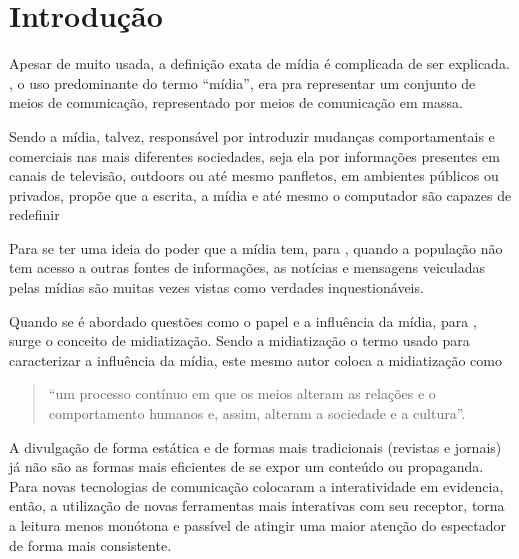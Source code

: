 \chapter[Introdução]{Introdução}
Apesar de muito usada, a definição exata de mídia é complicada de ser explicada.  \cite[p.49]{guazina2007} , o uso predominante do termo ``mídia'', era pra representar um conjunto de meios de comunicação, representado por meios de comunicação em massa.


Sendo a mídia, talvez, responsável por introduzir mudanças comportamentais e comerciais nas mais diferentes sociedades, seja ela por informações presentes em canais de televisão, outdoors ou até mesmo panfletos, em ambientes públicos ou privados, \cite[p.3]{escobar2007} propõe que a escrita, a mídia e até mesmo o computador são capazes de redefinir 
\begin{quote}  \end{quote} 



Para se ter uma ideia do poder que a mídia tem, para \cite{silva2007}, quando a população não tem acesso a outras fontes de informações, as notícias e mensagens veiculadas pelas mídias são muitas vezes vistas como verdades inquestionáveis. 

Quando se é abordado questões como o papel e a influência da mídia, para \cite[p.54]{hjarvard2012}, surge o conceito de midiatização. Sendo a midiatização o termo usado para caracterizar a influência da mídia, este mesmo autor coloca a midiatização como \begin{quote}``um processo contínuo em que os meios alteram as relações e o comportamento humanos e, assim, alteram a sociedade e a cultura''.\end{quote} 


A divulgação de forma estática e de formas mais tradicionais (revistas e jornais) já não são as formas mais eficientes de se expor um conteúdo ou propaganda. Para \cite[p.2]{escobar2007} novas tecnologias de comunicação colocaram a interatividade em evidencia, então, a utilização de novas ferramentas mais interativas com seu receptor, torna a leitura menos monótona e passível de atingir uma maior atenção do espectador de forma mais consistente.

